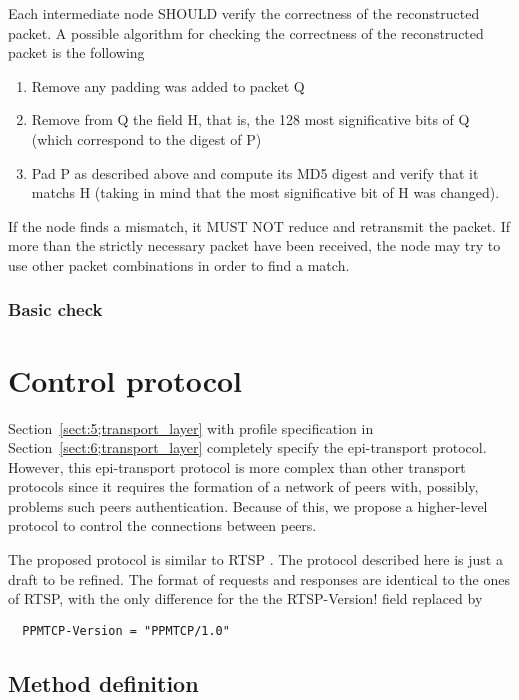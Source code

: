 \documentclass{rfc}
\begin{document}
Each intermediate node SHOULD verify the correctness of the
reconstructed packet. A possible algorithm for checking the
correctness of the reconstructed packet is the following
%
\begin{enumerate}
  \item
    Remove any padding was added to packet Q
  \item
    Remove from Q the field H, that is,  the 128 most significative
    bits of Q  (which correspond to the digest of P)
  \item
    Pad P as described above and compute its MD5 digest and verify
    that it matchs H (taking in mind that the most significative bit
    of H was changed).
\end{enumerate}
%
If the node finds a mismatch, it MUST NOT reduce and retransmit the
packet.  If more than the strictly necessary packet have been
received, the node may try to use other packet combinations in order
to find a match.

\subsection{Basic check}
\label{subsub:5.1.1;transport_layer}



\chapter{Control protocol}
\label{sect:7;transport_layer}

Section~\ref{sect:5;transport_layer} with profile specification in
Section~\ref{sect:6;transport_layer} completely specify the
epi-transport protocol.  However, this epi-transport protocol is
more complex than other transport protocols since it requires the
formation of a network of peers with, possibly, problems such peers
authentication.  Because of this, we propose a higher-level protocol
to control the connections between peers.

The proposed protocol is similar to RTSP \cite{rfc2326}.  The protocol
described here is just a draft to be refined.  The format of requests
and responses are identical to the ones of RTSP, with the only
difference for the the \ttt RTSP-Version! field replaced by
%
\begin{verbatim}
  PPMTCP-Version = "PPMTCP/1.0"
\end{verbatim}

\section{Method definition}
\label{sub:7.0;transport_layer}
\end{document}
